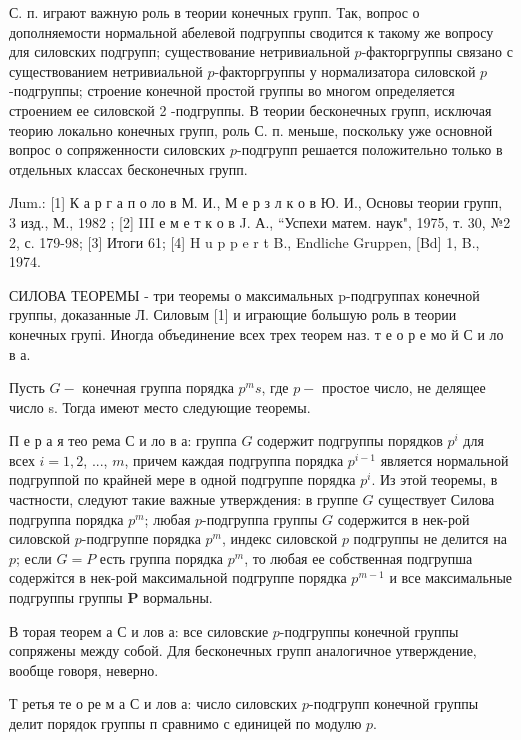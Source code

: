 \documentclass[10pt]{article}
\begin{document}
С. п. играют важную роль в теории конечных групп. Так, вопрос о дополняемости нормальной абелевой подгруппы сводится к такому же вопросу для силовских подгрупп; существование нетривиальной $p$-факторгруппы связано с существованием нетривиальной $p$-факторгруппы у нормализатора силовской $p$-подгруппы; строение конечной простой группы во многом определяется строением ее силовской 2 -подгруппы. В теории бесконечных групп, исключая теорию локально конечных групп, роль С. п. меньше, поскольку уже основной вопрос о сопряженности силовских $p$-подгрупп решается положительно только в отдельных классах бесконечных групп.



Лum.: [1] К а р г а п о ло в М. И., М е р з л к о в Ю. И., Основы теории групп, 3 изд., М., 1982 ; [2] III е м е т к о в J. А., “Успехи матем. наук", 1975, т. 30, №2 2, с. 179-98; [3] Итоги 61; [4] H u p p e r t B., Endliche Gruppen, [Bd] 1, B., 1974.



СИЛОВА ТЕОРЕМЫ - три теоремы о максимальных p-подгруппах конечной группы, доказанные Л. Силовым [1] и играющие большую роль в теории конечных групі. Иногда объединение всех трех теорем наз. т е о р е мо й С и ло в а.



Пусть $G-$ конечная группа порядка $p^{m} s$, где $p-$ простое число, не делящее число s. Тогда имеют место следующие теоремы.



П е р а я тео рема С и ло в а: группа $G$ содержит подгруппы порядков $p^{i}$ для всех $i=1,2$, ..., $m$, причем каждая подгруппа порядка $p^{i-1}$ является нормальной подгруппой по крайней мере в одной подгруппе порядка $p^{i}$. Из этой теоремы, в частности, следуют такие важные утверждения: в группе $G$ существует Силова подгруппа порядка $p^{m}$; любая $p$-подгруппа группы $G$ содержится в нек-рой силовской $p$-подгруппе порядка $p^{m}$, индекс силовской $p$ подгруппы не делится на $p$; если $G=P$ есть группа порядка $p^{m}$, то любая ее собственная подгрупша содержітся в нек-рой максимальной подгруппе порядка $p^{m-1}$ и все максимальные подгруппы группы $\boldsymbol{P}$ вормальны.



В торая теорем а С и лов а: все силовские $p$-подгруппы конечной группы сопряжены между собой. Для бесконечных групп аналогичное утверждение, вообще говоря, неверно.



Т ретья те о ре м а С и лов а: число силовских $p$-подгрупп конечной группы делит порядок группы п сравнимо с единицей по модулю $p$.
\end{document}
